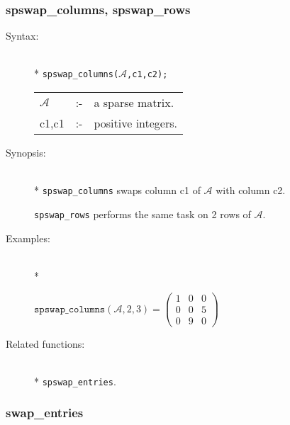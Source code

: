 \subsubsection{spswap\_columns, spswap\_rows}
\label{sparse:spswap_columns}

\begin{description}
\item[Syntax:]\mbox{}\\*
\texttt{spswap\_columns($\mathcal{A}$,c1,c2);}\\[2mm]
\begin{tabular}{l l l}
$\mathcal{A}$ &:-& a sparse matrix. \\
c1,c1      &:-& positive integers. 
\end{tabular}

\item[Synopsis:]\mbox{}\\*
\texttt{spswap\_columns} swaps column c1 of $\mathcal{A}$ with column c2. 

\texttt{spswap\_rows} performs the same task on 2 rows of 
                $\mathcal{A}$.

\item[Examples:]\mbox{}\\*
\begin{flushleft}  
\begin{math}  
\texttt{spswap\_columns}(\mathcal{A},2,3) =
        \begin{pmatrix} 1 & 0 & 0 \\ 0 & 0 & 5 \\ 0 & 9 & 0 \end{pmatrix}
\end{math}  
\end{flushleft}

\item[Related functions:]\mbox{}\\*
\texttt{spswap\_entries}.
\end{description}

\subsubsection{swap\_entries}
\label{sparse:spadd_entries}

